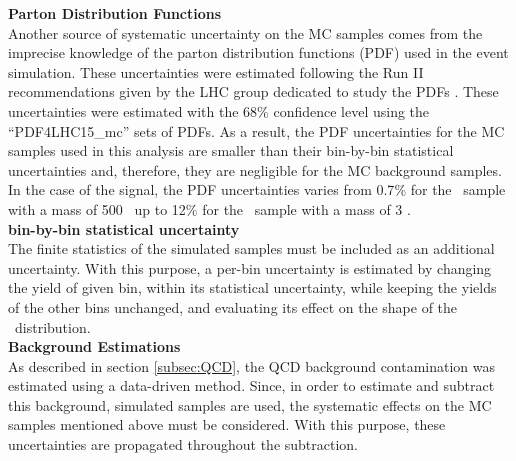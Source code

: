 \textbf{Parton Distribution Functions}\\

\noindent Another source of systematic uncertainty on the MC samples comes from the imprecise
knowledge of the parton distribution functions (PDF) used in the event simulation. These
uncertainties were estimated following the Run II recommendations given by the LHC 
group dedicated to study the PDFs \cite{PDFUncertainty}. These uncertainties
were estimated with the 68$\%$ confidence level using the ``PDF4LHC15\_mc'' sets
of PDFs. As a result, the PDF uncertainties for the MC samples used in this 
analysis are smaller than their bin-by-bin statistical uncertainties and, therefore,
they are negligible for the MC background samples. In the case of the 
signal, the PDF uncertainties varies from 0.7$\%$ for the \Zprime~sample with a mass 
of 500 \GeV~up to 12$\%$ for the \Zprime~sample with a mass of 3 \TeV. \\

 \textbf{bin-by-bin statistical uncertainty}\\
 
 \noindent The finite statistics of the simulated samples
 must be included as an additional uncertainty. With this purpose, 
 a per-bin uncertainty is estimated by changing the yield of given bin, within 
 its statistical uncertainty, while keeping the yields of the other bins unchanged, and 
 evaluating its effect on the shape of the \mass~distribution.\\
 

 \textbf{Background Estimations}\\

\noindent As described in section \ref{subsec:QCD}, the QCD background contamination
was estimated using a data-driven method. Since, in order to estimate and subtract
this background, simulated samples are used, the systematic effects on the MC samples mentioned 
above must be considered. With this purpose, these uncertainties are propagated 
throughout the subtraction.\\

% 
% 

